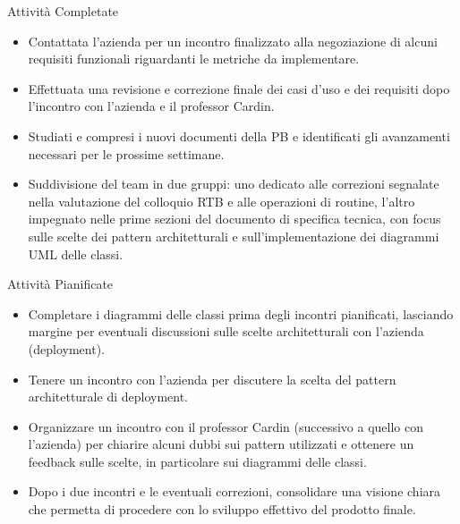 \documentclass{beamer}
\begin{document}
\begin{frame}
    \begin{block}{Attività Completate}
        \begin{itemize}
            \item Contattata l'azienda per un incontro finalizzato alla negoziazione di alcuni requisiti funzionali riguardanti le metriche da implementare.
            \item Effettuata una revisione e correzione finale dei casi d'uso e dei requisiti dopo l'incontro con l'azienda e il professor Cardin.
            \item Studiati e compresi i nuovi documenti della PB e identificati gli avanzamenti necessari per le prossime settimane.
            \item Suddivisione del team in due gruppi: uno dedicato alle correzioni segnalate nella valutazione del colloquio RTB e alle operazioni di routine, l'altro impegnato nelle prime sezioni del documento di specifica tecnica, con focus sulle scelte dei pattern architetturali e sull'implementazione dei diagrammi UML delle classi.
        \end{itemize}
    \end{block}
\end{frame}

\begin{frame}
    \begin{block}{Attività Pianificate}
        \begin{itemize}
            \item Completare i diagrammi delle classi prima degli incontri pianificati, lasciando margine per eventuali discussioni sulle scelte architetturali con l'azienda (deployment).
            \item Tenere un incontro con l'azienda per discutere la scelta del pattern architetturale di deployment.
            \item Organizzare un incontro con il professor Cardin (successivo a quello con l'azienda) per chiarire alcuni dubbi sui pattern utilizzati e ottenere un feedback sulle scelte, in particolare sui diagrammi delle classi.
            \item Dopo i due incontri e le eventuali correzioni, consolidare una visione chiara che permetta di procedere con lo sviluppo effettivo del prodotto finale.
        \end{itemize}
    \end{block}
\end{frame}
\end{document}
